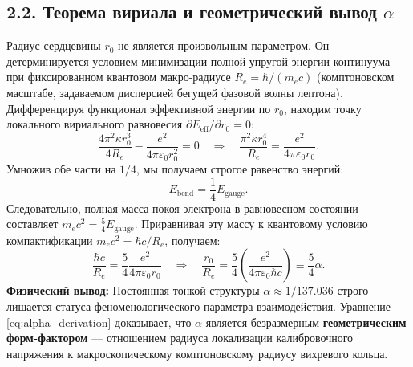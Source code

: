 \documentclass[12pt,a4paper]{article}
\begin{document}
	\subsection{2.2. Теорема вириала и геометрический вывод $\alpha$}
	Радиус сердцевины $r_0$ не является произвольным параметром. Он детерминируется условием минимизации полной упругой энергии континуума при фиксированном квантовом макро-радиусе $R_e = \hbar / (m_e c)$ (комптоновском масштабе, задаваемом дисперсией бегущей фазовой волны лептона).
	Дифференцируя функционал эффективной энергии по $r_0$, находим точку локального вириального равновесия $\partial E_{\text{eff}} / \partial r_0 = 0$:
	\begin{equation}
		\frac{4 \pi^2 \kappa r_0^3}{4R_e} - \frac{e^2}{4\pi\varepsilon_0 r_0^2} = 0 \quad \Longrightarrow \quad \frac{\pi^2 \kappa r_0^4}{R_e} = \frac{e^2}{4\pi\varepsilon_0 r_0}.
	\end{equation}
	Умножив обе части на $1/4$, мы получаем строгое равенство энергий:
	\begin{equation}
		E_{\text{bend}} = \frac{1}{4} E_{\text{gauge}}.
	\end{equation}
	Следовательно, полная масса покоя электрона в равновесном состоянии составляет $m_e c^2 = \frac{5}{4} E_{\text{gauge}}$. Приравнивая эту массу к квантовому условию компактификации $m_e c^2 = \hbar c / R_e$, получаем:
	\begin{equation}
		\frac{\hbar c}{R_e} = \frac{5}{4} \frac{e^2}{4\pi\varepsilon_0 r_0} \quad \Longrightarrow \quad \frac{r_0}{R_e} = \frac{5}{4} \left( \frac{e^2}{4\pi\varepsilon_0 \hbar c} \right) \equiv \frac{5}{4} \alpha.
		\label{eq:alpha_derivation}
	\end{equation}
	\textbf{Физический вывод:} Постоянная тонкой структуры $\alpha \approx 1/137.036$ строго лишается статуса феноменологического параметра взаимодействия. Уравнение \eqref{eq:alpha_derivation} доказывает, что $\alpha$ является безразмерным \textbf{геометрическим форм-фактором} — отношением радиуса локализации калибровочного напряжения к макроскопическому комптоновскому радиусу вихревого кольца.
	
\end{document}
